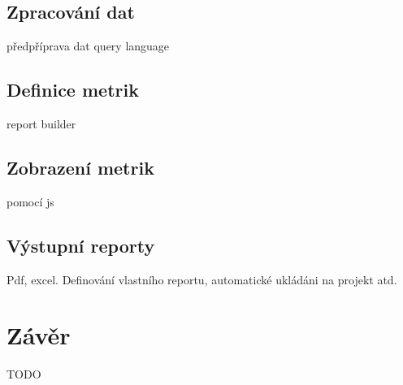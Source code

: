 \documentclass[czech,master,public,dept460,male,cpdeclaration,oneside]{diploma}
\begin{document}
\subsection{Zpracování dat}
předpříprava dat query language

\subsection{Definice metrik}
report builder

\subsection{Zobrazení metrik}
pomocí js


\subsection{Výstupní reporty}
Pdf, excel. Definování vlastního reportu, automatické ukládáni na projekt atd.
    

\section{Závěr}
TODO 
\end{document}
